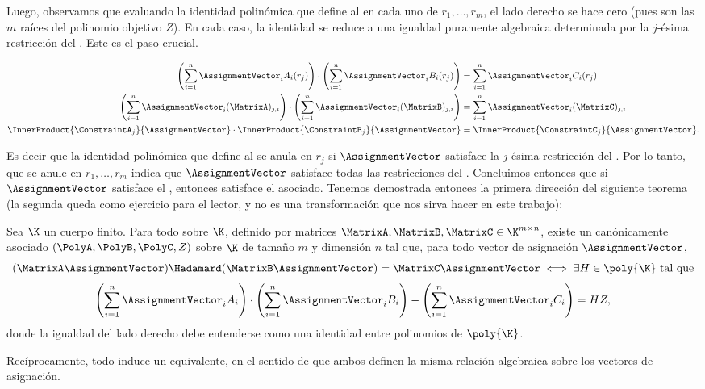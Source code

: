 Luego, observamos que evaluando la identidad polinómica que define al \QAP en cada uno de $r_1, \ldots, r_m$, el lado derecho se hace cero (pues son las $m$ raíces del polinomio objetivo $Z$). En cada caso, la identidad se reduce a una igualdad puramente algebraica determinada por la $j$-ésima restricción del \ROneCS. Este es el paso crucial.

$$\begin{aligned}
	\left(\sum_{i=1}^{n} \AssignmentVector_i A_i(r_j)\right) \cdot \left(\sum_{i=1}^{n} \AssignmentVector_i B_i(r_j)\right) &= \sum_{i=1}^{n} \AssignmentVector_i C_i(r_j) \\
		\left(\sum_{i=1}^{n} \AssignmentVector_i (\MatrixA)_{j,i} \right) \cdot \left(\sum_{i=1}^{n} \AssignmentVector_i (\MatrixB)_{j,i} \right) &= \sum_{i=1}^{n} \AssignmentVector_i (\MatrixC)_{j,i} \\
		\InnerProduct{\ConstraintA_j}{\AssignmentVector} \cdot \InnerProduct{\ConstraintB_j}{\AssignmentVector} &= \InnerProduct{\ConstraintC_j}{\AssignmentVector}.\\
\end{aligned}$$

Es decir que la identidad polinómica que define al \QAP se anula en $r_j$ si $\AssignmentVector$ satisface la $j$-ésima restricción del \ROneCS. Por lo tanto, que se anule en $r_1, \ldots, r_m$ indica que $\AssignmentVector$ satisface todas las restricciones del \ROneCS. Concluimos entonces que si $\AssignmentVector$ satisface el \ROneCS, entonces satisface el \QAP asociado. Tenemos demostrada entonces la primera dirección del siguiente teorema (la segunda queda como ejercicio para el lector, y no es una transformación que nos sirva hacer en este trabajo):

\begin{theorem}
	Sea $\K$ un cuerpo finito. Para todo \ROneCS sobre $\K$, definido por matrices $\MatrixA, \MatrixB, \MatrixC \in \K^{m \times n}$, existe un \QAP canónicamente asociado $(\PolyA, \PolyB, \PolyC, Z)$ sobre $\K$ de tamaño $m$ y dimensión $n$ tal que, para todo vector de asignación $\AssignmentVector$,
	$$(\MatrixA\AssignmentVector) \Hadamard (\MatrixB\AssignmentVector) = \MatrixC\AssignmentVector \iff \exists H \in \poly{\K}\ \textnormal{tal que}$$
	$$\left(\sum_{i=1}^{n} \AssignmentVector_i A_i\right) \cdot \left(\sum_{i=1}^{n} \AssignmentVector_i B_i\right) - \left(\sum_{i=1}^{n} \AssignmentVector_i C_i\right) = HZ,$$
	donde la igualdad del lado derecho debe entenderse como una identidad entre polinomios de $\poly{\K}$.
	
	Recíprocamente, todo \QAP induce un \ROneCS equivalente, en el sentido de que ambos definen la misma relación algebraica sobre los vectores de asignación.
\end{theorem}

